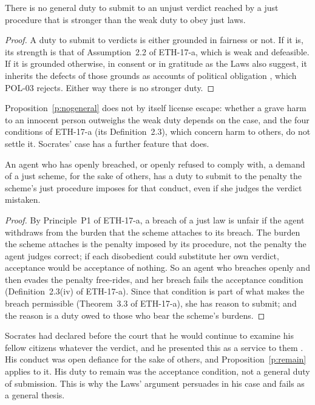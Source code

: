 \documentclass{situationist-preprint}
\begin{document}
\begin{proposition}\label{p:nogeneral}
There is no general duty to submit to an unjust verdict reached by a just procedure that is stronger than the weak duty to obey just laws.
\end{proposition}

\begin{proof}
A duty to submit to verdicts is either grounded in fairness or not. If it is, its strength is that of Assumption~2.2 of ETH-17-a, which is weak and defeasible. If it is grounded otherwise, in consent or in gratitude as the Laws also suggest, it inherits the defects of those grounds as accounts of political obligation \citep{Simmons1979}, which POL-03 rejects. Either way there is no stronger duty.
\end{proof}

Proposition~\ref{p:nogeneral} does not by itself license escape: whether a grave harm to an innocent person outweighs the weak duty depends on the case, and the four conditions of ETH-17-a (its Definition~2.3), which concern harm to others, do not settle it. Socrates' case has a further feature that does.

\begin{proposition}\label{p:remain}
An agent who has openly breached, or openly refused to comply with, a demand of a just scheme, for the sake of others, has a duty to submit to the penalty the scheme's just procedure imposes for that conduct, even if she judges the verdict mistaken.
\end{proposition}

\begin{proof}
By Principle~P1 of ETH-17-a, a breach of a just law is unfair if the agent withdraws from the burden that the scheme attaches to its breach. The burden the scheme attaches is the penalty imposed by its procedure, not the penalty the agent judges correct; if each disobedient could substitute her own verdict, acceptance would be acceptance of nothing. So an agent who breaches openly and then evades the penalty free-rides, and her breach fails the acceptance condition (Definition~2.3(iv) of ETH-17-a). Since that condition is part of what makes the breach permissible (Theorem~3.3 of ETH-17-a), she has reason to submit; and the reason is a duty owed to those who bear the scheme's burdens.
\end{proof}

Socrates had declared before the court that he would continue to examine his fellow citizens whatever the verdict, and he presented this as a service to them \citep[30a--31c]{PlatoApology}. His conduct was open defiance for the sake of others, and Proposition~\ref{p:remain} applies to it. His duty to remain was the acceptance condition, not a general duty of submission. This is why the Laws' argument persuades in his case and fails as a general thesis.
\end{document}
